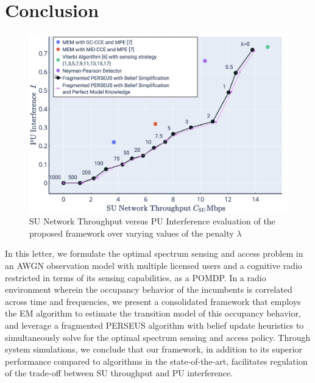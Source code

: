 \documentclass[10pt,twocolumn]{IEEEtran}
\begin{document}
\section{Conclusion}\label{V}
\begin{figure}
    \centering
    \includegraphics[width=0.80\linewidth]{SU_Throughput_PU_Interference_Varying_Penalty.png}
    \caption{SU Network Throughput versus PU Interference evaluation of the proposed framework over varying values of the penalty $\lambda$}
    \vspace{-4mm}
    \label{fig:8}
\end{figure}
In this letter, we formulate the optimal spectrum sensing and access problem in an AWGN observation model with multiple licensed users and a cognitive radio restricted in terms of its sensing capabilities, as a POMDP. In a radio environment wherein the occupancy behavior of the incumbents is correlated across time and frequencies, we present a consolidated framework that employs the EM algorithm to estimate the transition model of this occupancy behavior, and leverage a fragmented PERSEUS algorithm with belief update heuristics to simultaneously solve for the optimal spectrum sensing and access policy. Through system simulations, we conclude that our framework, in addition to its superior performance compared to algorithms in the state-of-the-art, facilitates regulation of the trade-off between SU throughput and PU interference.

\vspace{-4mm}

\end{document}
